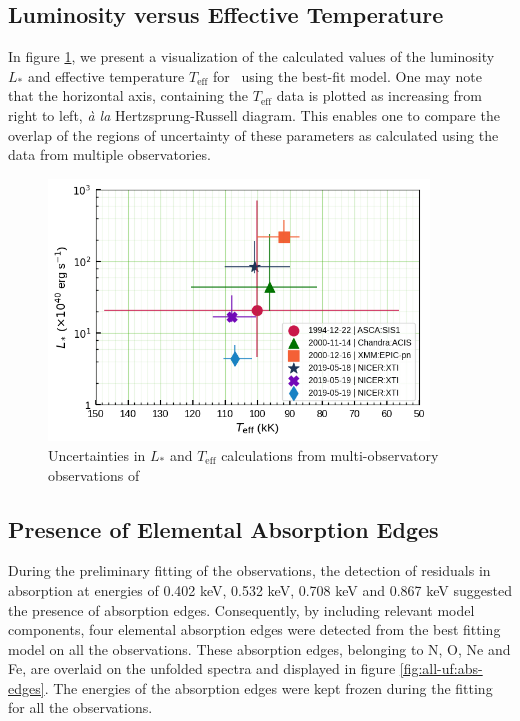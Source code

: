     	\subsection{Luminosity versus Effective Temperature} \label{multi-obs:results:L-vs-Teff}
    		In figure \ref{fig:L-Teff}, we present a visualization of the calculated values of the luminosity $L_*$ and effective temperature $T_\text{eff}$ for \source\ using the best-fit model. One may note that the horizontal axis, containing the $T_\text{eff}$ data is plotted as increasing from right to left, \textit{\`{a} la} Hertzsprung-Russell diagram. This enables one to compare the overlap of the regions of uncertainty of these parameters as calculated using the data from multiple observatories.
    		
    		\begin{figure}[!thb]
		    	\centering
		    	\includegraphics[width=0.9\textwidth]{images/L-Teff_all-obs.png}
		    	\caption{Uncertainties in $L_*$ and $T_\text{eff}$ calculations from multi-observatory observations of \source}
		    	\label{fig:L-Teff}
		    \end{figure}
    	
    	\subsection{Presence of Elemental Absorption Edges} \label{multi-obs:results:abs-edge}
    		During the preliminary fitting of the observations, the detection of residuals in absorption at energies of 0.402 keV, 0.532 keV, 0.708 keV and 0.867 keV suggested the presence of absorption edges. Consequently, by including relevant model components, four elemental absorption edges were detected from the best fitting model on all the observations. These absorption edges, belonging to N, O, Ne and Fe, are overlaid on the unfolded spectra and displayed in figure \ref{fig:all-uf:abs-edges}. The energies of the absorption edges were kept frozen during the fitting for all the observations.
    		

